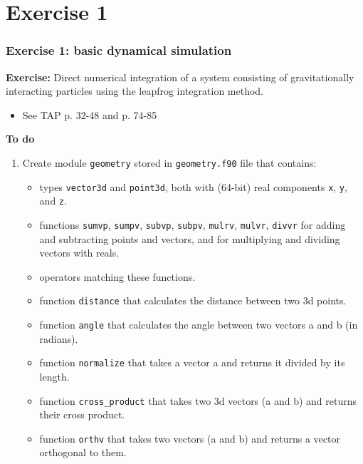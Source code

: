 
\subtitle{Course exercise 1: basic dynamical simulation}



\begin{frame}
  \titlepage
\end{frame}

\section{Exercise 1}

\begin{frame}
  \frametitle{Exercise 1: basic dynamical simulation}

  \textbf{Exercise:} Direct numerical integration of a system consisting of gravitationally interacting particles using the leapfrog integration method.
  \begin{itemize}
   \item See TAP p. 32-48 and p. 74-85
  \end{itemize}


  \textbf{To do}
  \begin{enumerate}
   \item Create module \texttt{geometry} stored in \texttt{geometry.f90} file that contains:
   \begin{itemize}
    \item types \texttt{vector3d} and \texttt{point3d}, both with (64-bit) real components \texttt{x}, \texttt{y}, and \texttt{z}.
    \item functions \texttt{sumvp}, \texttt{sumpv}, \texttt{subvp}, \texttt{subpv}, \texttt{mulrv}, \texttt{mulvr}, \texttt{divvr} for adding and subtracting points and vectors, and for multiplying and dividing vectors with reals.
    \item operators matching these functions.
    \item function \texttt{distance} that calculates the distance between two 3d points.
    \item function \texttt{angle} that calculates the angle between two vectors a and b (in radians).
    \item function \texttt{normalize} that takes a vector a and returns it divided by its length.
    \item function \texttt{cross\_product} that takes two 3d vectors (a and b) and returns their cross product.
    \item function \texttt{orthv} that takes two vectors (a and b) and returns a vector orthogonal to them.
   \end{itemize}
  \end{enumerate}
\end{frame}




